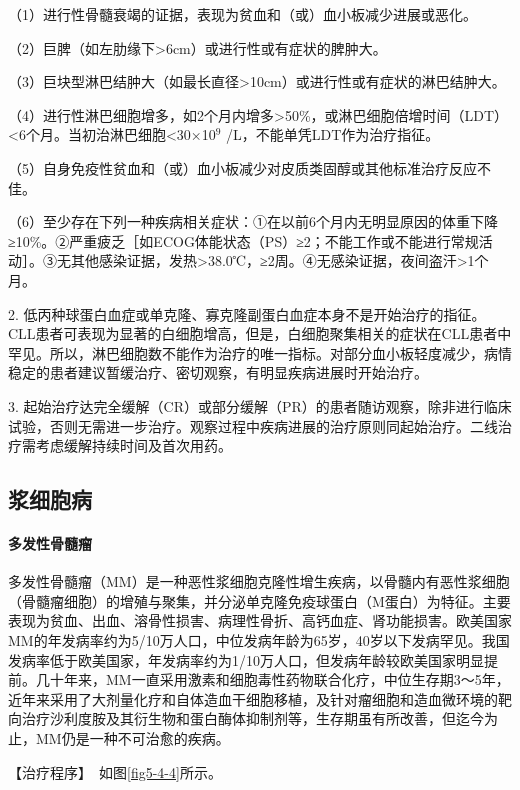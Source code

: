 （1）进行性骨髓衰竭的证据，表现为贫血和（或）血小板减少进展或恶化。

（2）巨脾（如左肋缘下\textgreater{}6cm）或进行性或有症状的脾肿大。

（3）巨块型淋巴结肿大（如最长直径\textgreater{}10cm）或进行性或有症状的淋巴结肿大。

（4）进行性淋巴细胞增多，如2个月内增多\textgreater{}50\%，或淋巴细胞倍增时间（LDT）<6个月。当初治淋巴细胞<30×10$^{9}$
/L，不能单凭LDT作为治疗指征。

（5）自身免疫性贫血和（或）血小板减少对皮质类固醇或其他标准治疗反应不佳。

（6）至少存在下列一种疾病相关症状：①在以前6个月内无明显原因的体重下降≥10\%。②严重疲乏［如ECOG体能状态（PS）≥2；不能工作或不能进行常规活动］。③无其他感染证据，发热\textgreater{}38.0℃，≥2周。④无感染证据，夜间盗汗\textgreater{}1个月。

2.
低丙种球蛋白血症或单克隆、寡克隆副蛋白血症本身不是开始治疗的指征。CLL患者可表现为显著的白细胞增高，但是，白细胞聚集相关的症状在CLL患者中罕见。所以，淋巴细胞数不能作为治疗的唯一指标。对部分血小板轻度减少，病情稳定的患者建议暂缓治疗、密切观察，有明显疾病进展时开始治疗。

3.
起始治疗达完全缓解（CR）或部分缓解（PR）的患者随访观察，除非进行临床试验，否则无需进一步治疗。观察过程中疾病进展的治疗原则同起始治疗。二线治疗需考虑缓解持续时间及首次用药。

\subsection{浆细胞病}

\paragraph{多发性骨髓瘤}

多发性骨髓瘤（MM）是一种恶性浆细胞克隆性增生疾病，以骨髓内有恶性浆细胞（骨髓瘤细胞）的增殖与聚集，并分泌单克隆免疫球蛋白（M蛋白）为特征。主要表现为贫血、出血、溶骨性损害、病理性骨折、高钙血症、肾功能损害。欧美国家MM的年发病率约为5/10万人口，中位发病年龄为65岁，40岁以下发病罕见。我国发病率低于欧美国家，年发病率约为1/10万人口，但发病年龄较欧美国家明显提前。几十年来，MM一直采用激素和细胞毒性药物联合化疗，中位生存期3～5年，近年来采用了大剂量化疗和自体造血干细胞移植，及针对瘤细胞和造血微环境的靶向治疗沙利度胺及其衍生物和蛋白酶体抑制剂等，生存期虽有所改善，但迄今为止，MM仍是一种不可治愈的疾病。

【治疗程序】　如图\ref{fig5-4-4}所示。

